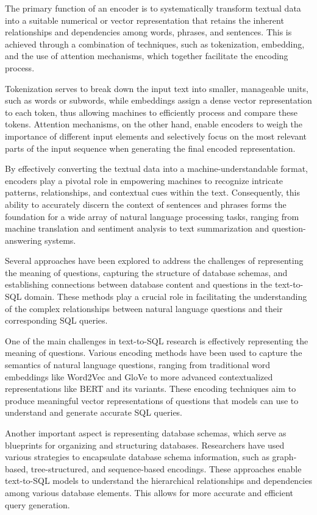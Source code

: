 The primary function of an encoder is to systematically transform textual data into a suitable numerical or vector representation that retains the inherent relationships and dependencies among words, phrases, and sentences\cite{cho-etal-2014-learning}. This is achieved through a combination of techniques, such as tokenization, embedding, and the use of attention mechanisms, which together facilitate the encoding process.

Tokenization serves to break down the input text into smaller, manageable units, such as words or subwords, while embeddings assign a dense vector representation to each token, thus allowing machines to efficiently process and compare these tokens. Attention mechanisms, on the other hand, enable encoders to weigh the importance of different input elements and selectively focus on the most relevant parts of the input sequence when generating the final encoded representation.

By effectively converting the textual data into a machine-understandable format, encoders play a pivotal role in empowering machines to recognize intricate patterns, relationships, and contextual cues within the text. Consequently, this ability to accurately discern the context of sentences and phrases forms the foundation for a wide array of natural language processing tasks, ranging from machine translation and sentiment analysis to text summarization and question-answering systems.

Several approaches have been explored to address the challenges of representing the meaning of questions, capturing the structure of database schemas, and establishing connections between database content and questions in the text-to-SQL domain\cite{deng2022recent}. These methods play a crucial role in facilitating the understanding of the complex relationships between natural language questions and their corresponding SQL queries.

One of the main challenges in text-to-SQL research is effectively representing the meaning of questions. Various encoding methods have been used to capture the semantics of natural language questions, ranging from traditional word embeddings like Word2Vec and GloVe to more advanced contextualized representations like BERT and its variants. These encoding techniques aim to produce meaningful vector representations of questions that models can use to understand and generate accurate SQL queries.

Another important aspect is representing database schemas, which serve as blueprints for organizing and structuring databases. Researchers have used various strategies to encapsulate database schema information, such as graph-based, tree-structured, and sequence-based encodings. These approaches enable text-to-SQL models to understand the hierarchical relationships and dependencies among various database elements. This allows for more accurate and efficient query generation.

